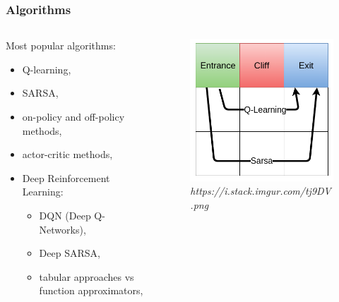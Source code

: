\begin{frame}
  \frametitle{Algorithms}

  \begin{columns}
    \begin{column}{0.5\textwidth}
      Most popular algorithms:
      \begin{itemize}
        \item{Q-learning,}
        \item{SARSA,}
        \item{on-policy and off-policy methods,}
        \item{actor-critic methods,}
        \item{Deep Reinforcement Learning:}
          \begin{itemize}
            \item{DQN (Deep Q-Networks),}
            \item{Deep SARSA,}
            \item{tabular approaches vs function approximators,}
          \end{itemize}
      \end{itemize}
    \end{column}

    \begin{column}{0.35\textwidth}
      \begin{figure}
        \includegraphics[width=\textwidth]{imgs/alg.png}
        \caption{\tiny \textit{https://i.stack.imgur.com/tj9DV.png}}
      \end{figure}
    \end{column}
  \end{columns}

\end{frame}
